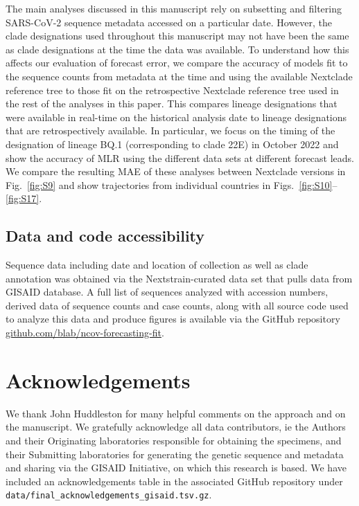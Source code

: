 The main analyses discussed in this manuscript rely on subsetting and filtering SARS-CoV-2 sequence metadata accessed on a particular date.
However, the clade designations used throughout this manuscript may not have been the same as clade designations at the time the data was available.
To understand how this affects our evaluation of forecast error, we compare the accuracy of models fit to the sequence counts from metadata at the time and using the available Nextclade reference tree to those fit on the retrospective Nextclade reference tree used in the rest of the analyses in this paper.
This compares lineage designations that were available in real-time on the historical analysis date to lineage designations that are retrospectively available.
In particular, we focus on the timing of the designation of lineage BQ.1 (corresponding to clade 22E) in October 2022 and show the accuracy of MLR using the different data sets at different forecast leads.
We compare the resulting MAE of these analyses between Nextclade versions in Fig.~\ref{fig:S9} and show trajectories from individual countries in Figs.~\ref{fig:S10}--\ref{fig:S17}.

\subsection*{Data and code accessibility}

Sequence data including date and location of collection as well as clade annotation was obtained via the Nextstrain-curated data set that pulls data from GISAID database.
A full list of sequences analyzed with accession numbers, derived data of sequence counts and case counts, along with all source code used to analyze this data and produce figures is available via the GitHub repository \href{https://github.com/blab/ncov-forecasting-fit}{github.com/blab/ncov-forecasting-fit}.

\section*{Acknowledgements}

We thank John Huddleston for many helpful comments on the approach and on the manuscript.
We gratefully acknowledge all data contributors, ie the Authors and their Originating laboratories responsible for obtaining the specimens, and their Submitting laboratories for generating the genetic sequence and metadata and sharing via the GISAID Initiative, on which this research is based.
We have included an acknowledgements table in the associated GitHub repository under \texttt{data/final\_acknowledgements\_gisaid.tsv.gz}.
